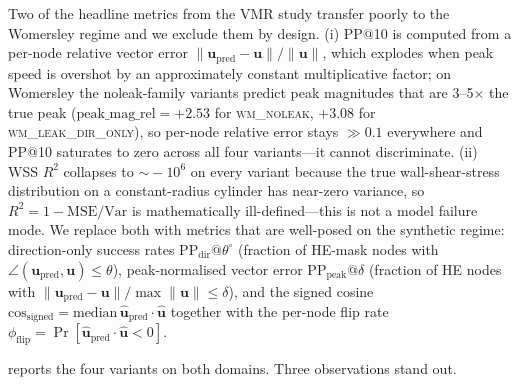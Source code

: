 \documentclass[10pt,a4paper]{article}
\makeatletter
\newcommand{\wmdir}{\textsc{wm\_leak\_dir\_only}}
\newcommand{\wmnoleak}{\textsc{wm\_noleak}}
\newcommand{\PPdir}[1]{\mathrm{PP_{dir}}@#1^\circ}
\newcommand{\cosgn}{\mathrm{cos}_\mathrm{signed}}
\newcommand{\fracflip}{\phi_\mathrm{flip}}
\makeatother
\begin{document}
Two of the headline metrics from the VMR study transfer poorly to
the Womersley regime and we exclude them by design. (i) PP@10 is
computed from a per-node relative vector error
$\|\mathbf{u}_\mathrm{pred}-\mathbf{u}\|/\|\mathbf{u}\|$, which
explodes when peak speed is overshot by an approximately constant
multiplicative factor; on Womersley the noleak-family variants
predict peak magnitudes that are 3--5$\times$ the true peak
($\mathrm{peak\_mag\_rel}=+2.53$ for \wmnoleak{},
$+3.08$ for \wmdir{}), so per-node
relative error stays $\gg 0.1$ everywhere and PP@10 saturates to
zero across all four variants---it cannot discriminate. (ii) WSS
$R^2$ collapses to $\sim\!-10^6$ on every variant because the true
wall-shear-stress distribution on a constant-radius cylinder has
near-zero variance, so $R^2 = 1 - \mathrm{MSE}/\mathrm{Var}$ is
mathematically ill-defined---this is not a model failure mode.
We replace both with metrics that are well-posed on the synthetic
regime: direction-only success rates $\PPdir{\theta}$ (fraction of
HE-mask nodes with $\angle(\mathbf{u}_\mathrm{pred},\mathbf{u})\le\theta$),
peak-normalised vector error
$\mathrm{PP}_\mathrm{peak}@\delta$ (fraction of HE nodes with
$\|\mathbf{u}_\mathrm{pred}-\mathbf{u}\|/\max\|\mathbf{u}\|\le\delta$),
and the signed cosine $\cosgn = \mathrm{median}\,\hat{\mathbf{u}}_\mathrm{pred}\!\cdot\!\hat{\mathbf{u}}$
together with the per-node flip rate
$\fracflip = \Pr[\hat{\mathbf{u}}_\mathrm{pred}\!\cdot\!\hat{\mathbf{u}}<0]$.

 reports the four variants on both domains.
Three observations stand out.
\end{document}
